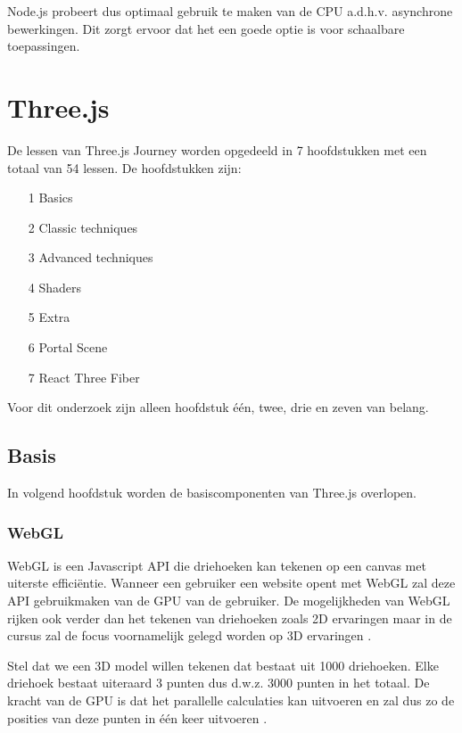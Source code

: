 Node.js probeert dus optimaal gebruik te maken van de CPU a.d.h.v. asynchrone bewerkingen. Dit zorgt ervoor dat het een goede optie is voor schaalbare toepassingen.

\newpage

\section{Three.js}

De lessen van Three.js Journey worden opgedeeld in 7 hoofdstukken met een totaal van 54 lessen. De hoofdstukken zijn:
\begin{itemize}
	\item[1] Basics
	\item[2] Classic techniques
	\item[3] Advanced techniques
	\item[4] Shaders
	\item[5] Extra
	\item[6] Portal Scene
	\item[7] React Three Fiber
\end{itemize}
Voor dit onderzoek zijn alleen hoofdstuk één, twee, drie en zeven van belang.

\subsection{Basis}

In volgend hoofdstuk worden de basiscomponenten van Three.js overlopen.

\subsubsection{WebGL}

WebGL is een Javascript API die driehoeken kan tekenen op een canvas met uiterste efficiëntie. Wanneer een gebruiker een website opent met WebGL zal deze API gebruikmaken van de GPU van de gebruiker. De mogelijkheden van WebGL rijken ook verder dan het tekenen van driehoeken zoals 2D ervaringen maar in de cursus zal de focus voornamelijk gelegd worden op 3D ervaringen \autocite{Simon2023}.

Stel dat we een 3D model willen tekenen dat bestaat uit 1000 driehoeken. Elke driehoek bestaat uiteraard 3 punten dus d.w.z. 3000 punten in het totaal. De kracht van de GPU is dat het parallelle calculaties kan uitvoeren en zal dus zo de posities van deze punten in één keer uitvoeren \autocite{Simon2023}.

